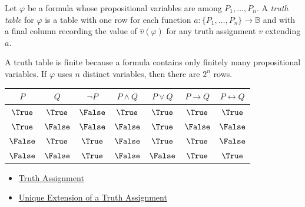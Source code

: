 \begin{tcolorbox}[colback=propbox, colframe=propborder, arc=2pt,
  left=6pt, right=6pt, top=4pt, bottom=4pt,
  title={\small\textbf{Definition (Truth Table)}},
  fonttitle=\small\bfseries]
\label{def:truth-table-propositional-logic}
Let $\varphi$ be a formula whose propositional variables are among
$P_1,\ldots,P_n$. A \emph{truth table} for $\varphi$ is a table with one row
for each function $a:\{P_1,\ldots,P_n\}\to\mathbb{B}$ and with a final column
recording the value of $\widehat v(\varphi)$ for any truth assignment $v$
extending $a$.
\end{tcolorbox}

\begin{remark*}[Interpretation]
A truth table is finite because a formula contains only finitely many
propositional variables. If $\varphi$ uses $n$ distinct variables, then there
are $2^n$ rows.
\end{remark*}

\begin{center}
\small
\renewcommand{\arraystretch}{1.15}
\begin{tabular}{cc|ccccc}
\toprule
$P$ & $Q$ & $\neg P$ & $P\land Q$ & $P\lor Q$ & $P\to Q$ & $P\leftrightarrow Q$ \\
\midrule
$\True$ & $\True$ & $\False$ & $\True$ & $\True$ & $\True$ & $\True$ \\
$\True$ & $\False$ & $\False$ & $\False$ & $\True$ & $\False$ & $\False$ \\
$\False$ & $\True$ & $\True$ & $\False$ & $\True$ & $\True$ & $\False$ \\
$\False$ & $\False$ & $\True$ & $\False$ & $\False$ & $\True$ & $\True$ \\
\bottomrule
\end{tabular}
\end{center}

\begin{dependencies}
\begin{itemize}
  \item \hyperref[def:truth-assignment-propositional-logic]{Truth Assignment}
  \item \hyperref[thm:unique-extension-truth-assignment-propositional-logic]{Unique Extension of a Truth Assignment}
\end{itemize}
\end{dependencies}
